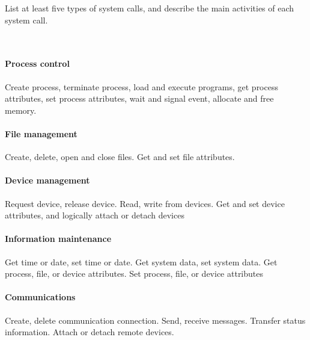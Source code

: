 \begin{exercise}[]{List at least five types of system calls, and describe the main activities of each system call.}
  \begin{solution}
  \par{~}
  \paragraph{Process control} Create process, terminate process, load and execute programs, get process attributes, set process attributes, wait and signal event, allocate and free memory.

  \paragraph{File management} Create, delete, open and close files. Get and set file attributes.

  \paragraph{Device management} Request device, release device. Read, write from devices. Get and set device attributes, and logically attach or detach devices

  \paragraph{Information maintenance} Get time or date, set time or date. Get system data, set system data. Get process, file, or device attributes. Set process, file, or device attributes

  \paragraph{Communications} Create, delete communication connection. Send, receive messages. Transfer status information. Attach or detach remote devices.

  \end{solution}
  \label{ex3}
\end{exercise}





